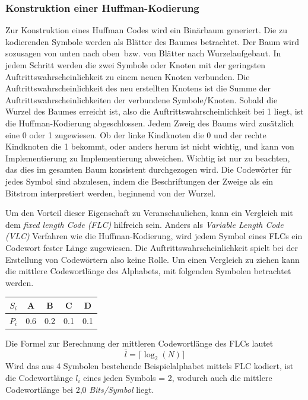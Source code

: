 \subsubsection{Konstruktion einer Huffman-Kodierung}
\label{subsubsec:konstruktion_huffman}
Zur Konstruktion eines Huffman Codes wird ein Binärbaum generiert.
Die zu kodierenden Symbole werden als Blätter des Baumes betrachtet.
Der Baum wird sozusagen von \glqq unten nach oben\grqq\ bzw. von \glqq Blätter nach Wurzel\grqq aufgebaut. \newline
In jedem Schritt werden die zwei Symbole oder Knoten mit der geringsten Auftrittswahrscheinlichkeit zu einem neuen Knoten verbunden.
Die Auftrittswahrscheinlichkeit des neu erstellten Knotens ist die Summe der Auftrittswahrscheinlichkeiten der verbundene Symbole/Knoten.
Sobald die Wurzel des Baumes erreicht ist, also die Auftrittswahrscheinlichkeit bei 1 liegt, ist die Huffman-Kodierung abgeschlossen.
Jedem Zweig des Baums wird zusätzlich eine 0 oder 1 zugewiesen.
Ob der linke Kindknoten die 0 und der rechte Kindknoten die 1 bekommt, oder anders herum ist nicht wichtig, und kann von Implementierung zu Implementierung abweichen.
Wichtig ist nur zu beachten, das dies im gesamten Baum konsistent durchgezogen wird.
Die Codewörter für jedes Symbol sind abzulesen, indem die Beschriftungen der Zweige als ein Bitstrom interpretiert werden, beginnend von der Wurzel.

Um den Vorteil dieser Eigenschaft zu Veranschaulichen, kann ein Vergleich mit dem \textit{fixed length Code (FLC)} hilfreich sein.
Anders als \textit{Variable Length Code (VLC)} Verfahren wie die Huffman-Kodierung, wird jedem Symbol eines FLCs ein Codewort fester Länge zugewiesen.
Die Auftrittswahrscheinlichkeit spielt bei der Erstellung von Codewörtern also keine Rolle.
Um einen Vergleich zu ziehen kann die mittlere Codewortlänge des Alphabets, mit folgenden Symbolen betrachtet werden.

\begin{table}[h]
\centering
\begin{tabular}{ccccc}
\toprule
\textbf{\textit{\(S_i\)}} & {A} & {B} & {C} & {D} \\
\midrule
\textbf{\textit{\(P_i\)}} & 0.6 & 0.2 & 0.1 & 0.1\\
\bottomrule
\end{tabular}
\end{table}

Die Formel zur Berechnung der mittleren Codewortlänge des FLCs lautet
\begin{equation*}
\bar{l} = \lceil \log_2(N) \rceil
\end{equation*}
Wird das aus 4 Symbolen bestehende Beispielalphabet mittels FLC kodiert, ist die Codewortlänge \(l_i\) eines jeden Symbols = 2, wodurch auch die mittlere Codewortlänge bei 2,0 \textit{Bits/Symbol} liegt.

